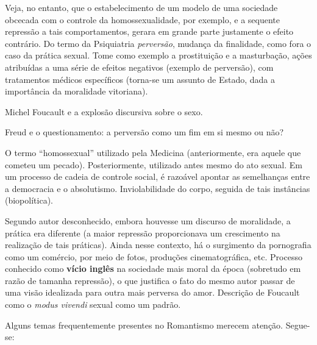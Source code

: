 \documentclass[12pt]{book}
\begin{document}
		\par Veja, no entanto, que o estabelecimento de um modelo de uma sociedade obcecada com o controle da homossexualidade, por exemplo, e a sequente repressão a tais comportamentos, gerara em grande parte justamente o efeito contrário. Do termo da Psiquiatria \textit{perversão}, mudança da finalidade, como fora o caso da prática sexual. Tome como exemplo a prostituição e a masturbação, ações atribuídas a uma série de efeitos negativos (exemplo de perversão), com tratamentos médicos específicos (torna-se um assunto de Estado, dada a importância da moralidade vitoriana).
		\par Michel Foucault e a explosão discursiva sobre o sexo.
		\par Freud e o questionamento: a perversão como um fim em si mesmo ou não?
		\par O termo ``homossexual'' utilizado pela Medicina (anteriormente, era aquele que cometeu um pecado). Posteriormente, utilizado antes mesmo do ato sexual. Em um processo de cadeia de controle social, é razoável apontar as semelhanças entre a democracia e o absolutismo. Inviolabilidade do corpo, seguida de tais instâncias (biopolítica).
		\par Segundo {autor desconhecido}, embora houvesse um discurso de moralidade, a prática era diferente (a maior repressão proporcionava um crescimento na realização de tais práticas). Ainda nesse contexto, há o surgimento da pornografia como um comércio, por meio de fotos, produções cinematográfica, etc. Processo conhecido como \textbf{vício inglês} na sociedade mais moral da época (sobretudo em razão de tamanha repressão), o que justifica o fato do mesmo autor passar de uma visão idealizada para outra mais perversa do amor. Descrição de Foucault como o \textit{modus vivendi} sexual como um padrão.
		\par Alguns temas frequentemente presentes no Romantismo merecem atenção. Segue-se:
\end{document}
